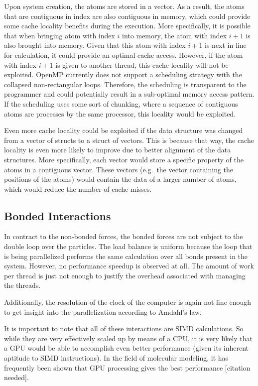 \documentclass[conference]{IEEEtran}
\begin{document}
Upon system creation, the atoms are stored in a vector. As a result, the atoms that are contiguous in index are also 
contiguous in memory, which could provide some
cache locality benefits during the execution. More specifically, it is possible that when bringing atom with index
$i$ into memory, the atom with index $i+1$ is also brought into memory. Given that this atom with index $i+1$ is next
in line for calculation, it could provide an optimal cache access. However, if the atom with index $i+1$ is given to
another thread, this cache locality will not be exploited. OpenMP currently does not support a scheduling
strategy with the collapsed non-rectangular loops. Therefore, the scheduling is transparent to the programmer
and could potentially result in a sub-optimal memory access pattern. If the scheduling uses some sort of chunking, where
a sequence of contiguous atoms are processes by the same processor, this locality would be exploited.

Even more cache locality could be exploited if the data structure was changed from a vector of structs to a struct 
of vectors. This is because that way, the cache locality is even more likely to improve due to better alignment of
the data structures. More specifically, each vector would store a specific property of the atoms in a contiguous vector.
These vectors (e.g.\ the vector containing the positions of the atoms) would contain the data of a larger number of
atoms, which would reduce the number of cache misses.

\subsection{Bonded Interactions}
In contract to the non-bonded forces, the bonded forces are not subject to the double loop over the particles.
The load balance is 
uniform because the loop that is being parallelized performs the same calculation over all bonds present in the
system.
However,
no performance speedup is observed at all. The amount of work per thread is just not enough to justify the overhead
associated with managing the threads.

Additionally, the resolution of the clock of the computer is again not fine enough to get insight into the parallelization
according to Amdahl's law.


It is important to note that all of these
interactions are SIMD calculations. So while they are very effectively scaled up by means of a CPU, it is very likely
that a GPU would be able to accomplish even better performance\cite{friedrichs2009accelerating} (given its inherent aptitude to SIMD instructions). 
In the field of molecular modeling, it has frequently been shown that GPU processing gives the best performance [citation needed].
\end{document}

